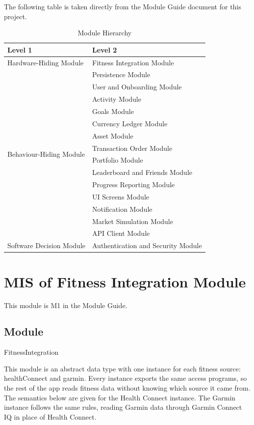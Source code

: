 \documentclass[12pt, titlepage]{article}
\begin{document}
The following table is taken directly from the Module Guide document for this project.

\begin{table}[H]
\centering
\begin{tabular}{p{} p{}}
\toprule
\textbf{Level 1} & \textbf{Level 2}\\
\midrule

Hardware-Hiding Module & Fitness Integration Module\\
\midrule

\multirow{14}{0.3\textwidth}{Behaviour-Hiding Module} & Persistence Module\\
& User and Onboarding Module\\
& Activity Module\\
& Goals Module\\
& Currency Ledger Module\\
& Asset Module\\
& Transaction Order Module\\
& Portfolio Module\\
& Leaderboard and Friends Module\\
& Progress Reporting Module\\
& UI Screens Module\\
& Notification Module\\
& Market Simulation Module\\
& API Client Module\\
\midrule

Software Decision Module & Authentication and Security Module\\
\bottomrule

\end{tabular}
\caption{Module Hierarchy}
\label{TblMH}
\end{table}

\section{MIS of Fitness Integration Module} \label{misFI}

This module is M1 in the Module Guide.

\subsection{Module}

FitnessIntegration

\medskip

\noindent This module is an abstract data type with one instance for each
fitness source: healthConnect and garmin. Every instance exports the
same access programs, so the rest of the app reads fitness data without
knowing which source it came from. The semantics below are given for the
Health Connect instance. The Garmin instance follows the same rules, reading
Garmin data through Garmin Connect IQ in place of Health Connect.
\end{document}
